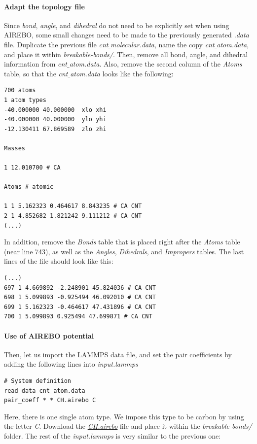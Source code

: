 \documentclass[9pt,tutorial]{livecoms}
\begin{document}
\paragraph{Adapt the topology file}
Since \textit{bond}, \textit{angle}, and \textit{dihedral} do not need to be explicitly set when using AIREBO, some small changes need to be made to the previously generated \textit{.data} file. Duplicate the previous file \textit{cnt$\_$molecular.data}, name the copy \textit{cnt$\_$atom.data}, and place it within \textit{breakable-bonds/}. Then, remove all bond, angle, and dihedral information from \textit{cnt$\_$atom.data}. Also, remove the second column of the \textit{Atoms} table, so that the \textit{cnt$\_$atom.data} looks like the following:
{\normalsize \begin{verbatim}
700 atoms
1 atom types
-40.000000 40.000000  xlo xhi
-40.000000 40.000000  ylo yhi
-12.130411 67.869589  zlo zhi

Masses

1 12.010700 # CA

Atoms # atomic

1 1 5.162323 0.464617 8.843235 # CA CNT
2 1 4.852682 1.821242 9.111212 # CA CNT
(...)
\end{verbatim}}
In addition, remove the \textit{Bonds} table that is placed right after the \textit{Atoms} table (near line 743), as well as the \textit{Angles}, \textit{Dihedrals}, and \textit{Impropers} tables. The last lines of the file should look like this:
{\normalsize \begin{verbatim}
(...)
697 1 4.669892 -2.248901 45.824036 # CA CNT
698 1 5.099893 -0.925494 46.092010 # CA CNT
699 1 5.162323 -0.464617 47.431896 # CA CNT
700 1 5.099893 0.925494 47.699871 # CA CNT
\end{verbatim}}

\paragraph{Use of AIREBO potential}
Then, let us import the LAMMPS data file, and set the pair coefficients by adding the following lines into \textit{input.lammps}
{\normalsize \begin{verbatim}
# System definition
read_data cnt_atom.data
pair_coeff * * CH.airebo C
\end{verbatim}}
Here, there is one single atom type. We impose this type to be carbon by using the letter \textit{C}. Download the \href{https://raw.githubusercontent.com/lammpstutorials/lammpstutorials-article/main/files/tutorial2/CH.airebo}{\textit{CH.airebo}} file and place it within the \textit{breakable-bonds/} folder. The rest of the \textit{input.lammps} is very similar to the previous one:
\end{document}
